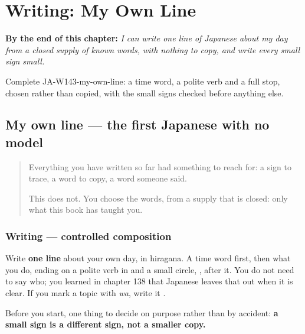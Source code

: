 
\chapter{Writing: My Own Line}
\label{ch:ja-writing-my-own-line}

\begin{chapteropening}
\textbf{By the end of this chapter:} \emph{I can write one line of Japanese about my day from a closed supply of known words, with nothing to copy, and write every small sign small.}

Complete JA-W143-my-own-line: a time word, a polite verb and a full stop, chosen rather than copied, with the small signs checked before anything else.
\end{chapteropening}

\section[(my own line)]{My own line — the first Japanese with no model}

\label{lesson:JA-W143-my-own-line}



\begin{quote}
Everything you have written so far had something to reach for: a sign to trace, a word to copy, a word someone said.

This does not. You choose the words, from a supply that is closed: only what this book has taught you.
\end{quote}

\subsection*{Writing — controlled composition}
Write \textbf{one line} about your own day, in hiragana. A time word first, then what you do, ending on a polite verb in \textbf{} and a small circle, \textbf{}, after it. You do not need to say who; you learned in chapter 138 that Japanese leaves that out when it is clear. If you mark a topic with \emph{wa}, write it \textbf{}.

Before you start, one thing to decide on purpose rather than by accident: \textbf{a small sign is a different sign, not a smaller copy.}

